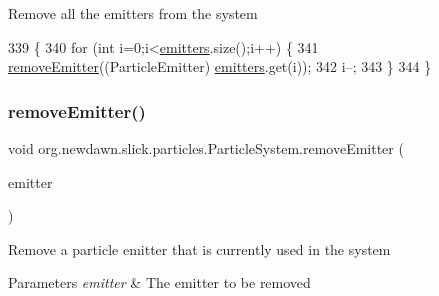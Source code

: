 Remove all the emitters from the system 
\begin{DoxyCode}
339                                     \{
340         \textcolor{keywordflow}{for} (\textcolor{keywordtype}{int} i=0;i<\mbox{\hyperlink{classorg_1_1newdawn_1_1slick_1_1particles_1_1_particle_system_aee956700fc1881201435275fdd6fc32b}{emitters}}.size();i++) \{
341             \mbox{\hyperlink{classorg_1_1newdawn_1_1slick_1_1particles_1_1_particle_system_a3c9ae5911ddadcb0436e5f858c6ecc43}{removeEmitter}}((ParticleEmitter) \mbox{\hyperlink{classorg_1_1newdawn_1_1slick_1_1particles_1_1_particle_system_aee956700fc1881201435275fdd6fc32b}{emitters}}.get(i));
342             i--;
343         \}
344     \}
\end{DoxyCode}
\mbox{\label{classorg_1_1newdawn_1_1slick_1_1particles_1_1_particle_system_a3c9ae5911ddadcb0436e5f858c6ecc43}} 
\subsubsection{\texorpdfstring{remove\+Emitter()}{removeEmitter()}}
{\footnotesize\ttfamily void org.\+newdawn.\+slick.\+particles.\+Particle\+System.\+remove\+Emitter (\begin{DoxyParamCaption}\item[{\mbox{\hyperlink{interfaceorg_1_1newdawn_1_1slick_1_1particles_1_1_particle_emitter}{Particle\+Emitter}}}]{emitter }\end{DoxyParamCaption})\hspace{0.3cm}{\ttfamily [inline]}}

Remove a particle emitter that is currently used in the system


\begin{DoxyParams}{Parameters}
{\em emitter} & The emitter to be removed \\
\hline
\end{DoxyParams}


